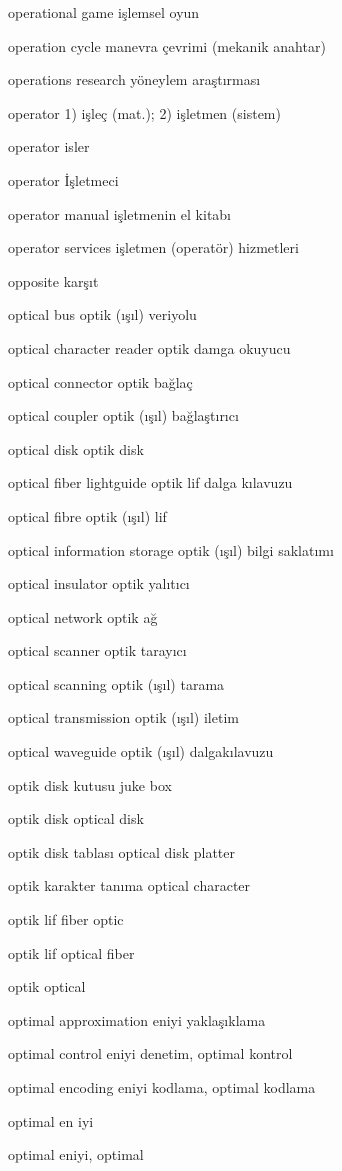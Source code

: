 \documentclass[12pt,fleqn]{article}\usepackage{../../common}
\begin{document}
operational game işlemsel oyun

operation cycle manevra çevrimi (mekanik anahtar)

operations research yöneylem araştırması

operator 1) işleç (mat.); 2) işletmen (sistem)

operator isler

operator İşletmeci

operator manual işletmenin el kitabı

operator services işletmen (operatör) hizmetleri

opposite karşıt

optical bus optik (ışıl) veriyolu

optical character reader optik damga okuyucu

optical connector optik bağlaç

optical coupler optik (ışıl) bağlaştırıcı

optical disk optik disk

optical fiber lightguide optik lif dalga kılavuzu

optical fibre optik (ışıl) lif

optical information storage optik (ışıl) bilgi saklatımı

optical insulator optik yalıtıcı

optical network optik ağ

optical scanner optik tarayıcı

optical scanning optik (ışıl) tarama

optical transmission optik (ışıl) iletim

optical waveguide optik (ışıl) dalgakılavuzu

optik disk kutusu juke box

optik disk optical disk

optik disk tablası optical disk platter

optik karakter tanıma optical character

optik lif fiber optic

optik lif optical fiber

optik optical

optimal approximation eniyi yaklaşıklama

optimal control eniyi denetim, optimal kontrol

optimal encoding eniyi kodlama, optimal kodlama

optimal en iyi

optimal eniyi, optimal
\end{document}
